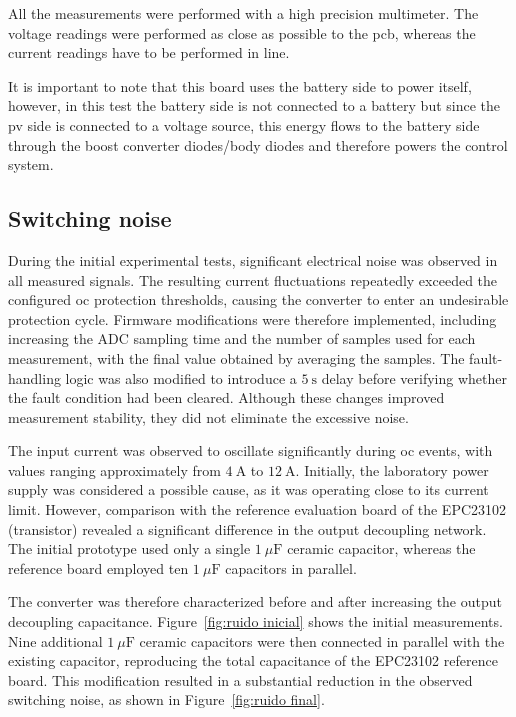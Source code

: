     All the measurements were performed with a high precision multimeter. The voltage readings were performed as close as possible to the \ac{pcb}, whereas the current readings have to be performed in line.

    It is important to note that this board uses the battery side to power itself, however, in this test the battery side is not connected to a battery but since the \ac{pv} side is connected to a voltage source, this energy flows to the battery side through the boost converter diodes/body diodes and therefore powers the control system.
        
    \subsection{Switching noise}
        During the initial experimental tests, significant electrical noise was observed in all measured signals. The resulting current fluctuations repeatedly exceeded the configured \ac{oc} protection thresholds, causing the converter to enter an undesirable protection cycle. Firmware modifications were therefore implemented, including increasing the ADC sampling time and the number of samples used for each measurement, with the final value obtained by averaging the samples. The fault-handling logic was also modified to introduce a $5~\mathrm{s}$ delay before verifying whether the fault condition had been cleared. Although these changes improved measurement stability, they did not eliminate the excessive noise.

        The input current was observed to oscillate significantly during \ac{oc} events, with values ranging approximately from $4~\mathrm{A}$ to $12~\mathrm{A}$. Initially, the laboratory power supply was considered a possible cause, as it was operating close to its current limit. However, comparison with the reference evaluation board of the EPC23102 (transistor) revealed a significant difference in the output decoupling network. The initial prototype used only a single $1~\mu\mathrm{F}$ ceramic capacitor, whereas the reference board employed ten $1~\mu\mathrm{F}$ capacitors in parallel.

        The converter was therefore characterized before and after increasing the output decoupling capacitance. Figure~\ref{fig:ruido inicial} shows the initial measurements. Nine additional $1~\mu\mathrm{F}$ ceramic capacitors were then connected in parallel with the existing capacitor, reproducing the total capacitance of the EPC23102 reference board. This modification resulted in a substantial reduction in the observed switching noise, as shown in Figure~\ref{fig:ruido final}.

